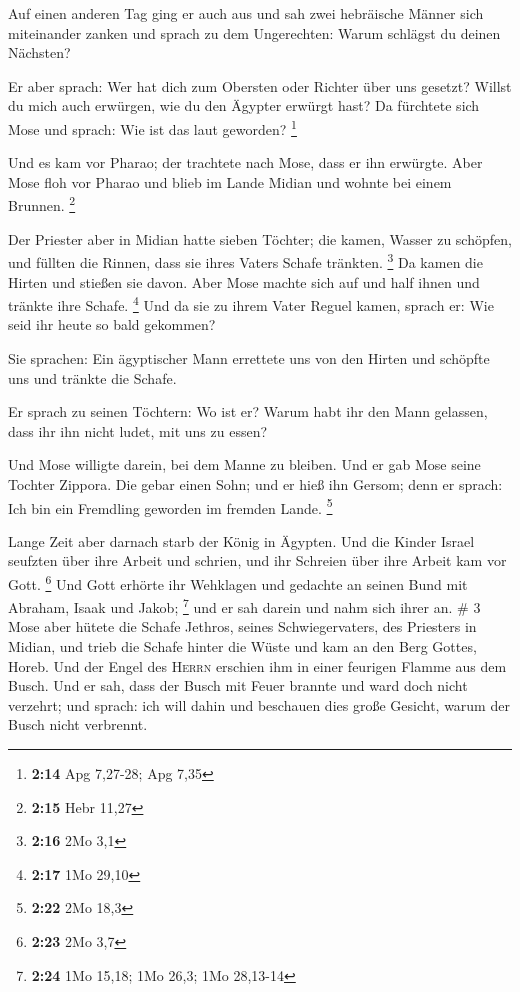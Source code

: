  Auf einen anderen Tag ging er auch aus und sah zwei
hebräische Männer sich miteinander zanken und sprach zu dem Ungerechten:
Warum schlägst du deinen Nächsten?

 Er aber sprach: Wer hat dich zum Obersten oder Richter
über uns gesetzt? Willst du mich auch erwürgen, wie du den Ägypter
erwürgt hast? Da fürchtete sich Mose und sprach: Wie ist das laut
geworden? \footnote{\textbf{2:14} Apg 7,27-28; Apg 7,35}

 Und es kam vor Pharao; der trachtete nach Mose, dass er
ihn erwürgte. Aber Mose floh vor Pharao und blieb im Lande Midian und
wohnte bei einem Brunnen. \footnote{\textbf{2:15} Hebr 11,27}

 Der Priester aber in Midian hatte sieben Töchter; die
kamen, Wasser zu schöpfen, und füllten die Rinnen, dass sie ihres Vaters
Schafe tränkten. \footnote{\textbf{2:16} 2Mo 3,1}  Da
kamen die Hirten und stießen sie davon. Aber Mose machte sich auf und
half ihnen und tränkte ihre Schafe. \footnote{\textbf{2:17} 1Mo 29,10}
 Und da sie zu ihrem Vater Reguel kamen, sprach er: Wie
seid ihr heute so bald gekommen?

 Sie sprachen: Ein ägyptischer Mann errettete uns von den
Hirten und schöpfte uns und tränkte die Schafe.

 Er sprach zu seinen Töchtern: Wo ist er? Warum habt ihr
den Mann gelassen, dass ihr ihn nicht ludet, mit uns zu essen?

 Und Mose willigte darein, bei dem Manne zu bleiben. Und
er gab Mose seine Tochter Zippora.  Die gebar einen Sohn;
und er hieß ihn Gersom; denn er sprach: Ich bin ein Fremdling geworden
im fremden Lande. \footnote{\textbf{2:22} 2Mo 18,3}

 Lange Zeit aber darnach starb der König in Ägypten. Und
die Kinder Israel seufzten über ihre Arbeit und schrien, und ihr
Schreien über ihre Arbeit kam vor Gott. \footnote{\textbf{2:23} 2Mo 3,7}
 Und Gott erhörte ihr Wehklagen und gedachte an seinen
Bund mit Abraham, Isaak und Jakob; \footnote{\textbf{2:24} 1Mo 15,18;
  1Mo 26,3; 1Mo 28,13-14}  und er sah darein und nahm
sich ihrer an. \# 3  Mose aber hütete die Schafe Jethros,
seines Schwiegervaters, des Priesters in Midian, und trieb die Schafe
hinter die Wüste und kam an den Berg Gottes, Horeb.  Und
der Engel des \textsc{Herrn} erschien ihm in einer feurigen Flamme aus
dem Busch. Und er sah, dass der Busch mit Feuer brannte und ward doch
nicht verzehrt;  und sprach: ich will dahin und beschauen
dies große Gesicht, warum der Busch nicht verbrennt.

